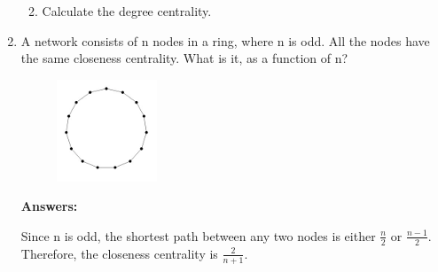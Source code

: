 \documentclass{amsart}
\theoremstyle{definition}
\theoremstyle{remark}
\numberwithin{equation}{section}
\begin{document}
\begin{enumerate}
\begin{enumerate}

\vspace{0.2cm}
\item Calculate the degree centrality. \vspace{0.2cm}




\vspace{0.2cm}
\end{enumerate}
\clearpage

\item A network consists of n nodes in a ring, where n is odd. All the nodes have the same closeness centrality. What is it, as a function of n? \vspace{0.2cm}


\begin{figure}[h]
\includegraphics[width=0.2\linewidth]{images/hw3_figure1.PNG}
\end{figure}

\vspace{0.2cm}

\textbf{Answers:}

\vspace{0.2cm}

Since n is odd, the shortest path between any two nodes is either $\frac{n}{2}$ or $\frac{n-1}{2}$. Therefore, the closeness centrality is $\frac{2}{n+1}$.


\end{enumerate}
\end{document}
